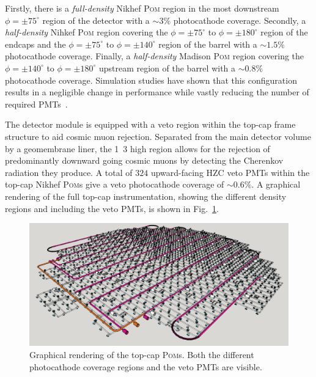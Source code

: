 Firstly, there is a \emph{full-density} Nikhef \textsc{Pom} region in the most downstream
$\phi=\pm75^{\circ}$ region of the detector with a $\sim3\%$ photocathode coverage. Secondly, a
\emph{half-density} Nihkef \textsc{Pom} region covering the $\phi=\pm75^{\circ}$ to
$\phi=\pm180^{\circ}$ region of the endcaps and the $\phi=\pm75^{\circ}$ to $\phi=\pm140^{\circ}$
region of the barrel with a $\sim1.5\%$ photocathode coverage. Finally, a \emph{half-density}
Madison \textsc{Pom} region covering the $\phi=\pm140^{\circ}$ to $\phi=\pm180^{\circ}$ upstream
region of the barrel with a $\sim0.8\%$ photocathode coverage. Simulation studies have shown that
this configuration results in a negligible change in performance while vastly reducing the number
of required PMTs~\cite{blake2016}.

The \chipsfive detector module is equipped with a veto region within the top-cap frame structure
to aid cosmic muon rejection. Separated from the main detector volume by a geomembrane liner, the
\unit{1.3}{} high region allows for the rejection of predominantly downward going cosmic
muons by detecting the Cherenkov radiation they produce. A total of $324$ upward-facing HZC veto
PMTs within the top-cap Nikhef \textsc{Pom}s give a veto photocathode coverage of $\sim0.6\%$. A
graphical rendering of the full top-cap instrumentation, showing the different density regions and
including the veto PMTs, is shown in Fig.~\ref{fig:top_cap}.

\begin{figure} %
    \includegraphics[width=\textwidth]{diagrams/4-chips/top_cap.pdf}
    \caption[Graphical rendering of the top-cap Planar Optical Modules]
    {Graphical rendering of the top-cap \textsc{Pom}s. Both the different photocathode coverage
        regions and the veto PMTs are visible.}
    \label{fig:top_cap}
\end{figure}

